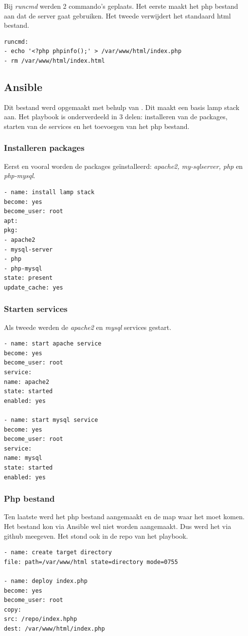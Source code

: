 Bij \textit{runcmd} werden 2 commando's geplaats. Het eerste maakt het php bestand aan dat de server gaat gebruiken. Het tweede verwijdert het standaard html bestand.
\begin{lstlisting}[basicstyle=\small]
runcmd:
- echo '<?php phpinfo();' > /var/www/html/index.php
- rm /var/www/html/index.html
\end{lstlisting}


\subsection{Ansible}
Dit bestand werd opgemaakt met behulp van \autocite{bekker}. Dit maakt een basis lamp stack aan. Het playbook is onderverdeeld in 3 delen: installeren van de packages, starten van de services en het  toevoegen van het php bestand.

\subsubsection{Installeren packages}
Eerst en vooral worden de packages geïnstalleerd: \textit{apache2, my-sqlserver, php} en \textit{php-mysql}.
\begin{lstlisting}[basicstyle=\small]
- name: install lamp stack
become: yes
become_user: root
apt:
pkg:
- apache2
- mysql-server
- php
- php-mysql
state: present
update_cache: yes
\end{lstlisting}

\subsubsection{Starten services}
Als tweede werden de \textit{apache2} en \textit{mysql} services gestart. 
\begin{lstlisting}[basicstyle=\small]
- name: start apache service
become: yes
become_user: root
service:
name: apache2
state: started
enabled: yes

- name: start mysql service
become: yes
become_user: root
service:
name: mysql
state: started
enabled: yes
\end{lstlisting}

\subsubsection{Php bestand}
Ten laatste werd het php bestand aangemaakt en de map waar het moet komen. Het bestand kon via Ansible wel niet worden aangemaakt. Dus werd het via github meegeven. Het stond ook in de repo van het playbook.
\begin{lstlisting}[basicstyle=\small]
- name: create target directory
file: path=/var/www/html state=directory mode=0755

- name: deploy index.php
become: yes
become_user: root
copy:
src: /repo/index.hphp
dest: /var/www/html/index.php
\end{lstlisting}

